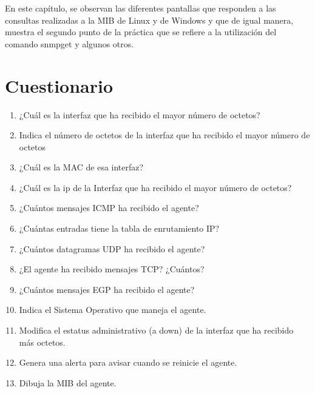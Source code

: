 En este capítulo, se observan las diferentes pantallas que responden a las consultas realizadas a la MIB de Linux y de Windows y que de igual manera, muestra el segundo punto de la práctica que se refiere a la utilización del comando snmpget y algunos otros.
\section{Cuestionario}
\begin{enumerate}

\item ¿Cuál es la interfaz que ha recibido el mayor número de octetos?
\item Indica el número de octetos  de la interfaz que ha recibido el mayor número de octetos
\item ¿Cuál es la MAC de esa interfaz?
\item ¿Cuál es la ip de la Interfaz que ha recibido el mayor número de octetos?
\item ¿Cuántos mensajes ICMP ha recibido el agente?
\item ¿Cuántas entradas tiene la tabla de enrutamiento IP?
\item ¿Cuántos datagramas UDP ha recibido el agente?
\item ¿El agente ha recibido mensajes TCP? ¿Cuántos?
\item ¿Cuántos mensajes EGP ha recibido el agente?
\item Indica el Sistema Operativo que maneja el agente.
\item Modifica el estatus administrativo (a down) de la interfaz que ha recibido más octetos.
\item Genera una alerta para avisar cuando se reinicie el agente.
\item Dibuja la MIB del agente.
\end{enumerate}